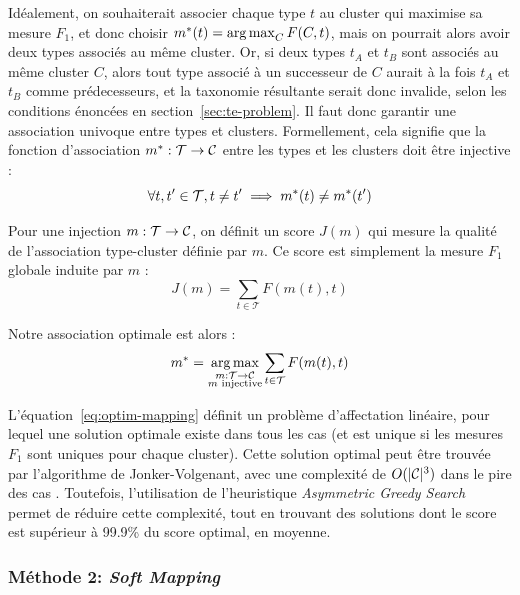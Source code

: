 Idéalement, on souhaiterait associer chaque type $t$ au cluster qui maximise sa mesure $F_1$, et donc choisir $m^*(t) = \operatorname*{arg\,max}_C F(C, t)$, mais on pourrait alors avoir deux types associés au même cluster. Or, si deux types $t_A$ et $t_B$ sont associés au même cluster $C$, alors tout type associé à un successeur de $C$ aurait à la fois $t_A$ et $t_B$ comme prédecesseurs, et la taxonomie résultante serait donc invalide, selon les conditions énoncées en section~\ref{sec:te-problem}. Il faut donc garantir une association univoque entre types et clusters. Formellement, cela signifie que la fonction d'association $m^* : \mathcal{T} \rightarrow \mathcal{C}$ entre les types et les clusters doit être injective :
\begin{equation}
    \forall t, t' \in \mathcal{T}, t \neq t' \implies m^*(t) \neq m^*(t')
\end{equation}


Pour une injection $m : \mathcal{T} \rightarrow \mathcal{C}$, on définit un score $J(m)$ qui mesure la qualité de l'association type-cluster définie par $m$. Ce score est simplement la mesure $F_1$ globale induite par $m$ :
\begin{equation}
    J(m) = \sum_{t \in \mathcal{T}} F(m(t), t)
\end{equation}

Notre association optimale est alors :
\begin{equation}
    m^* = \operatorname*{arg\,max}_{
\substack{m : \mathcal{T} \rightarrow \mathcal{C} \\ m\text{ injective}}} \sum_{t \in \mathcal{T}} F(m(t), t)
\label{eq:optim-mapping}
\end{equation}


L'équation~\ref{eq:optim-mapping} définit un problème d'affectation linéaire, pour lequel une solution optimale existe dans tous les cas (et est unique si les mesures $F_1$ sont uniques pour chaque cluster).
Cette solution optimal peut être trouvée par l'algorithme de Jonker-Volgenant, avec une complexité de $O(|\mathcal{C}|^3)$ dans le pire des cas \cite{jonker1987shortest}. Toutefois, l'utilisation de l'heuristique \textit{Asymmetric Greedy Search} \cite{brown2017heuristic} permet de réduire cette complexité, tout en trouvant des solutions dont le score est supérieur à 99.9\% du score optimal, en moyenne.

\subsubsection{Méthode 2: \textit{Soft Mapping}}
\label{ssubsec:te-softmapping}

